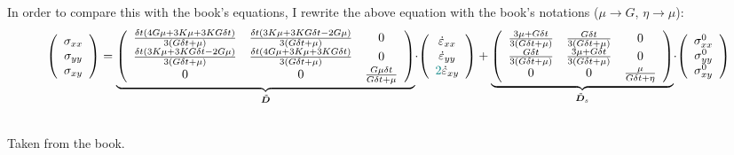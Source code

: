 In order to compare this with the book's equations, I rewrite the above equation with the 
book's notations ($\mu \rightarrow G$, $\eta\rightarrow \mu$):
\begin{eqnarray}
\left(
\begin{array}{c}
\sigma_{xx}\\ 
\sigma_{yy}\\ 
\sigma_{xy} 
\end{array}
\right)
=
\underbrace{
\left(
\begin{array}{ccc}
\frac{\delta t(4G \mu + 3K \mu+ 3K G\delta t)}{3(G \delta t + \mu)} &
\frac{\delta t(3K \mu+ 3K G\delta t - 2G \mu)}{3(G \delta t + \mu)} &
0 \\
\frac{\delta t(3K \mu+ 3K G\delta t  - 2G \mu)}{3(G \delta t + \mu)}&
\frac{\delta t(4G \mu + 3K \mu+ 3K G\delta t)}{3(G \delta t + \mu)} &
0  \\
0 & 0 & \frac{G \mu \delta t }{G \delta t + \mu}  \\
\end{array}
\right)
}_{\tilde{\bm D}}
\!
\cdot\!
\left(
\begin{array}{c}
\dot\varepsilon_{xx}\\ 
\dot\varepsilon_{yy}\\ 
{\color{teal}2}\dot\varepsilon_{xy} 
\end{array}
\right) 
+
\underbrace{
\left(
\begin{array}{cccccc}
\frac{3\mu + G \delta t}{3(G\delta t+\mu)} & 
\frac{G \delta t}{3(G\delta t+\mu)} & 
0\\
\frac{G \delta t}{3(G\delta t+\mu)} & 
\frac{3\mu + G \delta t}{3(G\delta t+\mu)} & 
0\\
0 & 0 & \frac{ \mu}{G\delta t + \eta}  
\end{array}
\right)
}_{\tilde{\bm D}_s}
\!\cdot\!
\left(
\begin{array}{c}
\sigma_{xx}^0\\ 
\sigma_{yy}^0\\ 
\sigma_{xy}^0 
\end{array}
\right) 
\nonumber
\end{eqnarray}



\begin{center}
\\
{\captionfont Taken from the book.}
\end{center}

